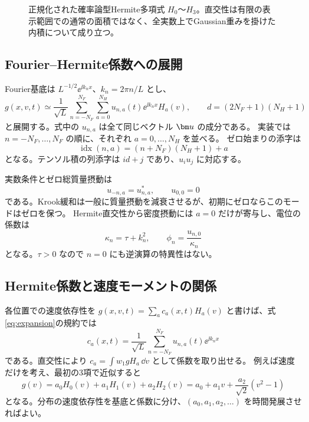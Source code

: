 \begin{figure}[htbp]
\centering

\caption{正規化された確率論型Hermite多項式 $H_0$〜$H_3$。直交性は有限の表示範囲での通常の面積ではなく、全実数上でGaussian重みを掛けた内積について成り立つ。}
\label{fig:hermite-polynomials}
\end{figure}

\subsection{Fourier--Hermite係数への展開}
Fourier基底は $L^{-1/2}\ee^{\ii k_nx}$、$k_n=2\pi n/L$ とし、
\begin{equation}
g(x,v,t)\simeq\frac1{\sqrt L}\sum_{n=-N_F}^{N_F}\sum_{a=0}^{N_H}
u_{n,a}(t)\ee^{\ii k_nx}H_a(v),\qquad d=(2N_F+1)(N_H+1)
\label{eq:expansion}
\end{equation}
と展開する。式中の $u_{n,a}$ は全て同じベクトル $\uu$ の成分である。
実装では $n=-N_F,\ldots,N_F$ の順に、それぞれ $a=0,\ldots,N_H$ を並べる。
ゼロ始まりの添字は
\[
\operatorname{idx}(n,a)=(n+N_F)(N_H+1)+a
\]
となる。テンソル積の列添字は $i d+j$ であり、$u_i u_j$ に対応する。

実数条件とゼロ総質量摂動は
\begin{equation}
u_{-n,a}=u_{n,a}^*,\qquad u_{0,0}=0
\end{equation}
である。Krook緩和は一般に質量摂動を減衰させるが、初期にゼロならこのモードはゼロを保つ。
Hermite直交性から密度摂動には $a=0$ だけが寄与し、電位の係数は
\begin{equation}
\kappa_n=\tau+k_n^2,\qquad \phi_n=\frac{u_{n,0}}{\kappa_n}
\end{equation}
となる。$\tau>0$ なので $n=0$ にも逆演算の特異性はない。

\subsection{Hermite係数と速度モーメントの関係}
各位置での速度依存性を $g(x,v,t)=\sum_a c_a(x,t)H_a(v)$ と書けば、式\eqref{eq:expansion}の規約では
\[
c_a(x,t)=\frac1{\sqrt L}\sum_{n=-N_F}^{N_F}u_{n,a}(t)\ee^{\ii k_nx}
\]
である。直交性により $c_a=\int w_1gH_a\,\dd v$ として係数を取り出せる。
例えば速度だけを考え、最初の3項で近似すると
\[
g(v)=a_0H_0(v)+a_1H_1(v)+a_2H_2(v)
=a_0+a_1v+\frac{a_2}{\sqrt2}(v^2-1)
\]
となる。分布の速度依存性を基底と係数に分け、$(a_0,a_1,a_2,\ldots)$ を時間発展させればよい。

